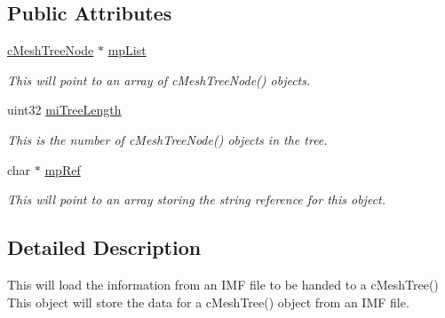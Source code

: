 \subsection*{Public Attributes}
\begin{DoxyCompactItemize}
\item 
\hypertarget{classc_mesh_tree_array_a83f4ee5f93ed62e7f939eed3b5e68cda}{
\hyperlink{classc_mesh_tree_node}{cMeshTreeNode} $\ast$ \hyperlink{classc_mesh_tree_array_a83f4ee5f93ed62e7f939eed3b5e68cda}{mpList}}
\label{classc_mesh_tree_array_a83f4ee5f93ed62e7f939eed3b5e68cda}

\begin{DoxyCompactList}\small\item\em This will point to an array of cMeshTreeNode() objects. \end{DoxyCompactList}\item 
\hypertarget{classc_mesh_tree_array_a23d238161a175633f64af87a2bc85984}{
uint32 \hyperlink{classc_mesh_tree_array_a23d238161a175633f64af87a2bc85984}{miTreeLength}}
\label{classc_mesh_tree_array_a23d238161a175633f64af87a2bc85984}

\begin{DoxyCompactList}\small\item\em This is the number of cMeshTreeNode() objects in the tree. \end{DoxyCompactList}\item 
\hypertarget{classc_mesh_tree_array_a1114b12bb1a849122403e0d2e1fb2ec6}{
char $\ast$ \hyperlink{classc_mesh_tree_array_a1114b12bb1a849122403e0d2e1fb2ec6}{mpRef}}
\label{classc_mesh_tree_array_a1114b12bb1a849122403e0d2e1fb2ec6}

\begin{DoxyCompactList}\small\item\em This will point to an array storing the string reference for this object. \end{DoxyCompactList}\end{DoxyCompactItemize}


\subsection{Detailed Description}
This will load the information from an IMF file to be handed to a cMeshTree() This object will store the data for a cMeshTree() object from an IMF file. 